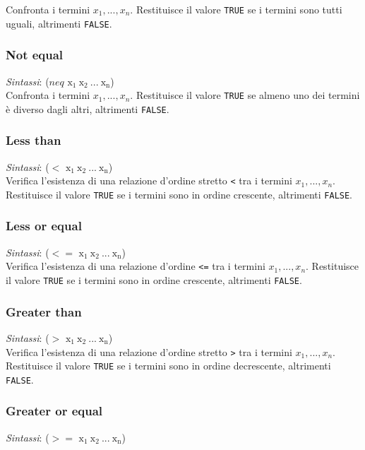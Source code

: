 Confronta i termini $x_1, ..., x_n$. Restituisce il valore \verb!TRUE! se i termini sono tutti uguali, altrimenti \verb!FALSE!.


\subsubsection{Not equal}
\emph{Sintassi}: ($neq$  $\mathrm{x_1 \ x_2 \ ... \ x_n}$)\\

Confronta i termini $x_1, ..., x_n$. Restituisce il valore \verb!TRUE! se almeno uno dei termini è diverso dagli altri, altrimenti \verb!FALSE!.


\subsubsection{Less than}
\emph{Sintassi}: ($<$  $\mathrm{x_1 \ x_2 \ ... \ x_n}$)\\

Verifica l'esistenza di una relazione d'ordine stretto \verb!<! tra  i termini $x_1, ..., x_n$. Restituisce il valore \verb!TRUE! se i termini sono in ordine crescente, altrimenti \verb!FALSE!.


\subsubsection{Less or equal}
\emph{Sintassi}: ($<=$  $\mathrm{x_1 \ x_2 \ ... \ x_n}$)\\

Verifica l'esistenza di una relazione d'ordine \verb!<=! tra i termini $x_1, ..., x_n$. Restituisce il valore \verb!TRUE! se i termini sono in ordine crescente, altrimenti \verb!FALSE!.


\subsubsection{Greater than}
\emph{Sintassi}: ($>$  $\mathrm{x_1 \ x_2 \ ... \ x_n}$)\\

Verifica l'esistenza di una relazione d'ordine stretto \verb!>! tra i termini $x_1, ..., x_n$. Restituisce il valore \verb!TRUE! se i termini sono in ordine decrescente, altrimenti \verb!FALSE!.


\subsubsection{Greater or equal}
\emph{Sintassi}: ($>=$  $\mathrm{x_1 \ x_2 \ ... \ x_n}$)\\


